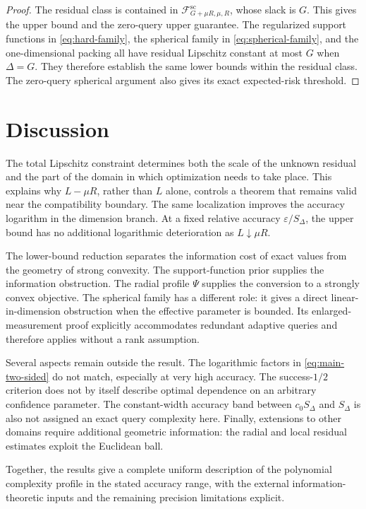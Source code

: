 \documentclass[11pt]{article}
\newcommand{\cF}{\mathcal{F}}
\newcommand{\eps}{\varepsilon}
\theoremstyle{plain}
\theoremstyle{definition}
\begin{document}
\begin{proof}
The residual class is contained in
$\cF^{\mathrm{sc}}_{G+\mu R,\mu,R}$, whose slack is $G$.
This gives the upper bound and the zero-query upper guarantee.
The regularized support functions in \eqref{eq:hard-family}, the
spherical family in \eqref{eq:spherical-family}, and the
one-dimensional packing all have residual Lipschitz constant at
most $G$ when $\Delta=G$. They therefore establish the same lower
bounds within the residual class. The zero-query spherical argument
also gives its exact expected-risk threshold.
\end{proof}

\section{Discussion}\label{sec:discussion}

The total Lipschitz constraint determines both the scale of the
unknown residual and the part of the domain in which optimization
needs to take place. This explains why $L-\mu R$, rather than $L$
alone, controls a theorem that remains valid near the compatibility
boundary. The same localization improves the accuracy logarithm in
the dimension branch. At a fixed relative accuracy $\eps/S_\Delta$,
the upper bound has no additional logarithmic deterioration as
$L\downarrow\mu R$.

The lower-bound reduction separates the information cost of exact
values from the geometry of strong convexity. The support-function
prior supplies the information obstruction. The radial profile
$\Psi$ supplies the conversion to a strongly convex objective.
The spherical family has a different role: it gives a direct
linear-in-dimension obstruction when the effective parameter is
bounded. Its enlarged-measurement proof explicitly accommodates
redundant adaptive queries and therefore applies without a rank
assumption.

Several aspects remain outside the result. The logarithmic factors
in \eqref{eq:main-two-sided} do not match, especially at very high
accuracy. The success-$1/2$ criterion does not by itself describe
optimal dependence on an arbitrary confidence parameter. The
constant-width accuracy band between $c_0S_\Delta$ and $S_\Delta$
is also not assigned an exact query complexity here. Finally,
extensions to other domains require additional geometric information:
the radial and local residual estimates exploit the Euclidean ball.

Together, the results give a complete uniform description of the
polynomial complexity profile in the stated accuracy range, with
the external information-theoretic inputs and the remaining precision
limitations explicit.
\end{document}
